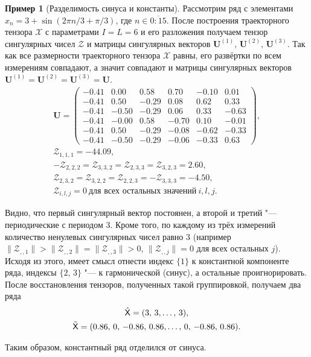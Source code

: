 \documentclass[specialist,
    substylefile = spbu_report.rtx,
    subf,href,colorlinks=true, 12pt]{disser}
\theoremstyle{plain}
\theoremstyle{definition}
\newtheorem{example}{Пример}[section]
\theoremstyle{remark}
\begin{document}
    \begin{example}[Разделимость синуса и константы]
        Рассмотрим ряд с элементами $x_n=3+\sin(2\pi n / 3 + \pi/3)$, где $n\in \overline{0:15}$.
        После построения траекторного тензора $\mathcal{X}$ с параметрами $I=L=6$ и его разложения получаем тензор
        сингулярных чисел $\mathcal{Z}$ и матрицы сингулярных векторов $\mathbf{U}^{(1)},\, \mathbf{U}^{(2)},\,\mathbf{U}^{(3)}$.
        Так как все размерности траекторного тензора $\mathcal{X}$ равны, его развёртки по всем
        измерениям совпадают, а значит совпадают и матрицы сингулярных векторов $\mathbf{U}^{(1)}=\mathbf{U}^{(2)}=\mathbf{U}^{(3)}=\mathbf{U}$.
        \begin{gather*}
            \mathbf{U}=
            \begin{pmatrix}
                -0.41 & 0.00  & 0.58  & 0.70  & -0.10 & 0.01  \\
                -0.41 & 0.50  & -0.29 & 0.08  & 0.62  & 0.33  \\
                -0.41 & -0.50 & -0.29 & 0.06  & 0.33  & -0.63 \\
                -0.41 & -0.00 & 0.58  & -0.70 & 0.10  & -0.01 \\
                -0.41 & 0.50  & -0.29 & -0.08 & -0.62 & -0.33 \\
                -0.41 & -0.50 & -0.29 & -0.06 & -0.33 & 0.63
            \end{pmatrix},\\
            \mathcal{Z}_{1,1,1}=-44.09,\\
            -\mathcal{Z}_{2,2,2}=\mathcal{Z}_{3,3,2}=\mathcal{Z}_{2,3,3}=\mathcal{Z}_{3,2,3}=2.60,\\
            \mathcal{Z}_{2,3,2}=\mathcal{Z}_{3,2,2}=\mathcal{Z}_{2,2,3}=-\mathcal{Z}_{3,3,3}=-4.50,\\
            \mathcal{Z}_{i,l,j}=0~\text{для всех остальных значений}~i, l, j.
        \end{gather*}

        Видно, что первый сингулярный вектор постоянен, а второй и третий "--- периодические с периодом 3.
        Кроме того, по каждому из трёх измерений количество ненулевых сингулярных чисел равно 3
        (например $\|\mathcal{Z}_{,,1}\|>\|\mathcal{Z}_{,,2}\|=\|\mathcal{Z}_{,,3}\|>0$, $\|\mathcal{Z}_{,,j}\|=0$ для всех остальных $j$).
        Исходя из этого, имеет смысл отнести индекс $\{1\}$ к константной компоненте ряда, индексы $\{2,\, 3\}$ "---
        к гармонической (синус), а остальные проигнорировать.
        После восстановления тензоров, полученных такой группировкой, получаем два ряда
        \begin{gather*}
            \hat{\mathsf{X}}=(3,\, 3,\ldots,\, 3),\\
            \tilde{\mathsf{X}}=(0.86,\, 0,\, -0.86,\,  0.86,\ldots,\, 0,\, -0.86,\, 0.86).
        \end{gather*}

        Таким образом, константный ряд отделился от синуса.
    \end{example}
\end{document}
